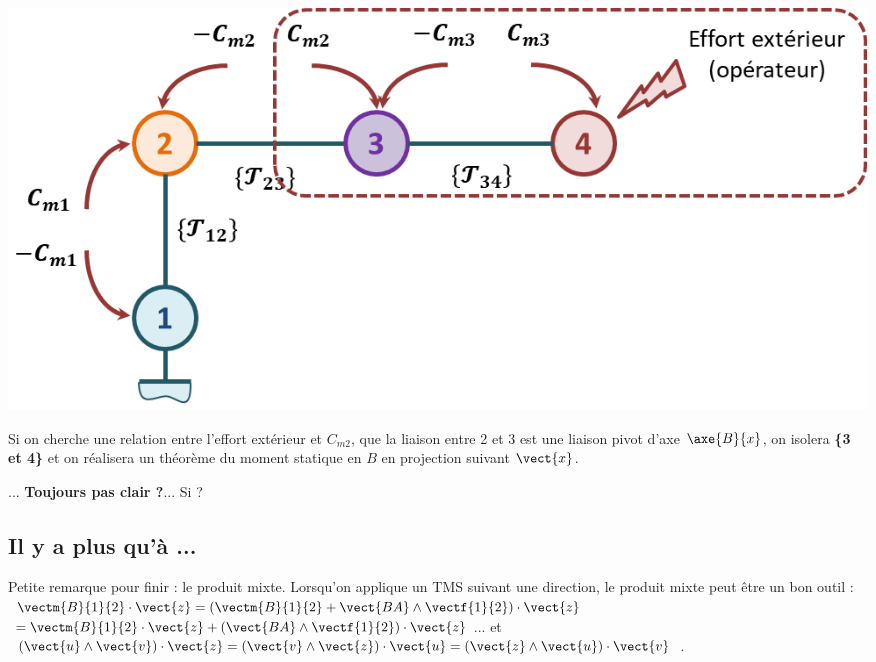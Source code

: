 \begin{minipage}[c]{.4\linewidth}
\begin{center}
\includegraphics[width=\linewidth]{images/fig_05}
\end{center}
\end{minipage}
\hfill
\begin{minipage}[c]{.55\linewidth}
Si on cherche une relation entre l'effort extérieur et $C_{m2}$, que la liaison entre 2 et 3 est une liaison pivot d'axe 
$\axe{B}{x}$, on isolera \textbf{\{3 et 4\}} et on réalisera un théorème du moment statique en $B$ en projection suivant $\vect{x}$.

... \textbf{Toujours pas clair ?}... Si ?

\end{minipage}


\subsection{Il y a plus qu'à ...}

Petite remarque pour finir : le produit mixte. Lorsqu'on applique un TMS suivant une direction, le produit mixte peut être un bon outil :
$\vectm{B}{1}{2}\cdot \vect{z} = \left( \vectm{B}{1}{2} + \vect{BA}\wedge \vectf{1}{2}\right)\cdot \vect{z}$
$=  \vectm{B}{1}{2}\cdot \vect{z} + \left(\vect{BA}\wedge \vectf{1}{2}\right)\cdot \vect{z}$...
et $\left(\vect{u} \wedge \vect{v}\right) \cdot \vect{z}= \left(\vect{v} \wedge \vect{z}\right) \cdot \vect{u}= \left(\vect{z} \wedge \vect{u}\right) \cdot \vect{v}$.